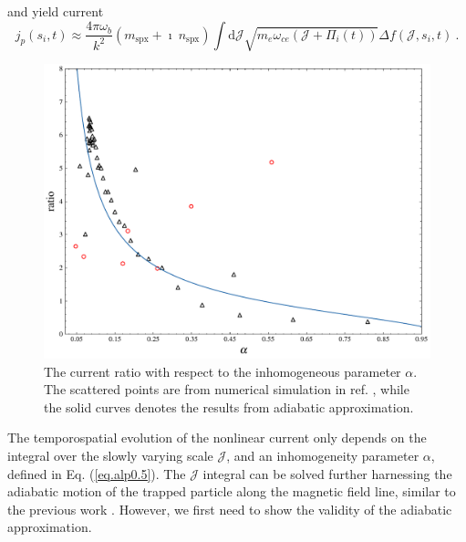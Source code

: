 and yield current 
\begin{equation}\label{eq.adi_J}
    j_p(s_i,t) \approx \frac{4 \pi \omega_b}{k^2} \left(m_\mathrm{s p x}+\imath ~ n_\mathrm{s p x}\right) \int \mathrm{d} \mathcal{J} \sqrt{m_e \omega_{c e}(\mathcal{J}+\Pi_i(t))} \Delta f(\mathcal{J},s_i,t) ~.
\end{equation}

\begin{figure}
    \centering
    \includegraphics[scale=0.5]{img/fig_adiabatic.pdf}
    \caption{The current ratio with respect to the inhomogeneous parameter $\alpha$. The scattered points are from numerical simulation in ref. \cite{zheng2023b}, while the solid curves denotes the results from adiabatic approximation.}
    \label{fig.adiabatic}
\end{figure}


The temporospatial evolution of the nonlinear current only depends on the integral over the slowly varying scale $\mathcal{J}$, and an inhomogeneity parameter $\alpha$, defined in Eq. (\ref{eq.alp0.5}). 
The $\mathcal{J}$ integral can be solved further harnessing the adiabatic motion of the trapped particle along the magnetic field line, similar to the previous work \cite{summers2012}. 
However, we first need to show the validity of the adiabatic approximation. 


